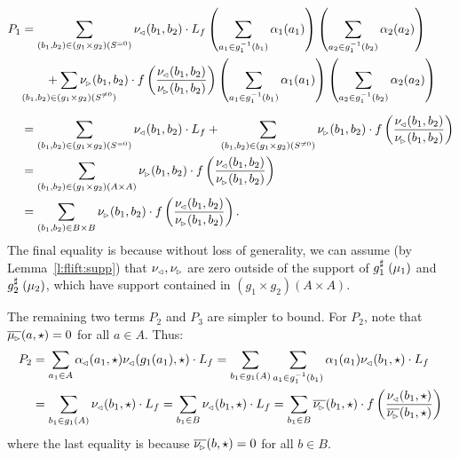 \documentclass{lmcs}
\begin{document}
  \begin{align*}
    P_1 &=
    \sum_{(b_1, b_2) \in (g_1 \times g_2)(S^{=0})} \nu\lside(b_1, b_2) \cdot L_f
    \left( \sum_{a_1 \in g_1^{-1}(b_1)} \alpha_1(a_1)\right)
    \left( \sum_{a_2 \in g_1^{-1}(b_2)} \alpha_2(a_2)\right) \\
    &\quad \quad
    + \sum_{\mathclap{(b_1, b_2) \in (g_1 \times g_2)(S^{\neq 0})}} \nu\rside(b_1, b_2) \cdot
    f \left( \frac{ \nu\lside(b_1, b_2) }{ \nu\rside(b_1, b_2) } \right)
    \left( \sum_{a_1 \in g_1^{-1}(b_1)} \alpha_1(a_1)\right)
    \left( \sum_{a_2 \in g_1^{-1}(b_2)} \alpha_2(a_2)\right) \\[.5em]
    &= 
    \sum_{(b_1, b_2) \in (g_1 \times g_2)(S^{=0})} \nu\lside(b_1, b_2) \cdot L_f
    + \sum_{(b_1, b_2) \in (g_1 \times g_2)(S^{\neq 0})} \nu\rside(b_1, b_2) \cdot
    f \left( \frac{ \nu\lside(b_1, b_2) }{ \nu\rside(b_1, b_2) } \right) \\
    &= 
    \sum_{(b_1, b_2) \in (g_1 \times g_2)(A \times A)} \nu\rside(b_1, b_2) \cdot
    f \left( \frac{ \nu\lside(b_1, b_2) }{ \nu\rside(b_1, b_2) } \right) \\
    &= \sum_{(b_1, b_2) \in B \times B} \nu\rside(b_1, b_2) \cdot
    f \left( \frac{ \nu\lside(b_1, b_2) }{ \nu\rside(b_1, b_2) } \right) .
  \end{align*}
  The final equality is because without loss of generality, we can assume (by
  Lemma~\ref{l:flift:supp}) that $\nu_{\mspace{-1.5mu}{\scriptscriptstyle \vartriangleleft}}, \nu_{\mspace{-1.5mu}{\scriptscriptstyle \vartriangleright}}$ are zero outside of the
  support of $\mathrel{g_1^\sharp}(\mu_1)$ and $\mathrel{g_2^\sharp}(\mu_2)$, which have support
  contained in $(g_1 \times g_2)(A \times A)$.

  The remaining two terms $P_2$ and $P_3$ are simpler to bound. For $P_2$, note
  that $\overline{\mu_{\mspace{-1.5mu}{\scriptscriptstyle \vartriangleright}}}(a, \star) = 0$ for all $a \in A$. Thus:
  \begin{align*}
    P_2 &= \sum_{a_1 \in A} \alpha_{\mspace{-1.5mu}{\scriptscriptstyle \vartriangleleft}}(a_1, \star) \nu_{\mspace{-1.5mu}{\scriptscriptstyle \vartriangleleft}}(g_1(a_1), \star)
    \cdot L_f
    = \sum_{b_1 \in g_1(A)} \sum_{a_1 \in g_1^{-1}(b_1)} \alpha_1(a_1)
    \nu_{\mspace{-1.5mu}{\scriptscriptstyle \vartriangleleft}}(b_1, \star) \cdot L_f \\
    &= \sum_{b_1 \in g_1(A)} \nu_{\mspace{-1.5mu}{\scriptscriptstyle \vartriangleleft}}(b_1, \star) \cdot L_f
    = \sum_{b_1 \in B} \nu_{\mspace{-1.5mu}{\scriptscriptstyle \vartriangleleft}}(b_1, \star) \cdot L_f
    = \sum_{b_1 \in B} \overline{\nu_{\mspace{-1.5mu}{\scriptscriptstyle \vartriangleright}}}(b_1, \star) \cdot
    f \left( \frac{ \nu_{\mspace{-1.5mu}{\scriptscriptstyle \vartriangleleft}}(b_1, \star) }{ \overline{\nu_{\mspace{-1.5mu}{\scriptscriptstyle \vartriangleright}}}(b_1, \star) } \right)
  \end{align*}
  where the last equality is because $\overline{\nu_{\mspace{-1.5mu}{\scriptscriptstyle \vartriangleright}}}(b, \star) = 0$ for
  all $b \in B$.
\end{document}
